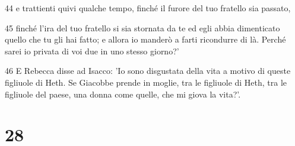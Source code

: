 \par 44 e trattienti quivi qualche tempo, finché il furore del tuo fratello sia passato,
\par 45 finché l'ira del tuo fratello si sia stornata da te ed egli abbia dimenticato quello che tu gli hai fatto; e allora io manderò a farti ricondurre di là. Perché sarei io privata di voi due in uno stesso giorno?'
\par 46 E Rebecca disse ad Isacco: 'Io sono disgustata della vita a motivo di queste figliuole di Heth. Se Giacobbe prende in moglie, tra le figliuole di Heth, tra le figliuole del paese, una donna come quelle, che mi giova la vita?'.

\chapter{28}


